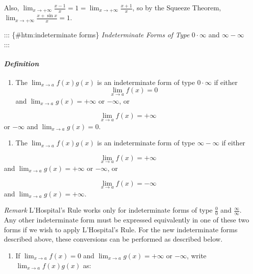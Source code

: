\documentclass[
  letterpaper,
  DIV=11,
  numbers=noendperiod]{scrartcl}
\let\oldparagraph\paragraph
\renewcommand{\paragraph}[1]{\oldparagraph{#1}\mbox{}}
\providecommand{\tightlist}{%
  \setlength{\itemsep}{0pt}\setlength{\parskip}{0pt}}\usepackage{longtable,booktabs,array}
\theoremstyle{plain}
\theoremstyle{remark}
\begin{document}
Also,
\(\displaystyle\lim_{x\to+\infty}{\frac{x-1}{x}=1=\displaystyle\lim_{x\to+\infty}{\frac{x+1}{x}}}\),
so by the Squeeze Theorem,
\(\displaystyle\lim_{x\to+\infty}{\frac{x+\sin x}{x}=1}\).

::: \{\#htm:indeterminate forms\} \emph{Indeterminate Forms of Type}
\(0\cdot \infty\) and \(\infty -\infty\) :::

\hypertarget{htm:definition}{}
\hypertarget{definition}{%
\paragraph{\texorpdfstring{\emph{Definition}}{Definition}}\label{definition}}

\begin{enumerate}
\def\labelenumi{\arabic{enumi}.}
\tightlist
\item
  The \(\displaystyle\lim_{x\to a}{f(x)g(x)}\) is an indeterminate form
  of type \(0\cdot \infty\) if either \[
  \displaystyle\lim_{x\to a}{f(x)=0}\] and
  \(\displaystyle\lim_{x\to a}{g(x)=+\infty}\) or \(-\infty\), or
\end{enumerate}

\[
\displaystyle\lim_{x\to a}{f(x)=+\infty}
\] or \(-\infty\) and \(\displaystyle\lim_{x\to a}{g(x)=0}\).

\begin{enumerate}
\def\labelenumi{\arabic{enumi}.}
\setcounter{enumi}{1}
\tightlist
\item
  The \(\displaystyle\lim_{x\to a}{f(x)g(x)}\) is an indeterminate form
  of type \(\infty - \infty\) if either
\end{enumerate}

\[
\displaystyle\lim_{x\to a}{f(x)=+\infty}
\] and \(\displaystyle\lim_{x\to a}{g(x)=+\infty}\) or \(-\infty\), or

\[
\displaystyle\lim_{x\to a}{f(x)=-\infty}
\] and \(\displaystyle\lim_{x\to a}{g(x)=+\infty}\).

\leavevmode{}%
\emph{Remark} L'Hospital's Rule works only for indeterminate forms of
type \(\frac{0}{0}\) and \(\frac{\infty}{\infty}\). Any other
indeterminate form must be expressed equivalently in one of these two
forms if we wish to apply L'Hospital's Rule. For the new indeterminate
forms described above, these conversions can be performed as described
below.

\begin{enumerate}
\def\labelenumi{\arabic{enumi}.}
\tightlist
\item
  If \(\displaystyle\lim_{x\to a}{f(x)=0}\) and
  \(\displaystyle\lim_{x\to a}{g(x)=+\infty}\) or \(-\infty\), write
  \(\displaystyle\lim_{x\to a}{f(x)g(x)}\) as:
\end{enumerate}
\end{document}
